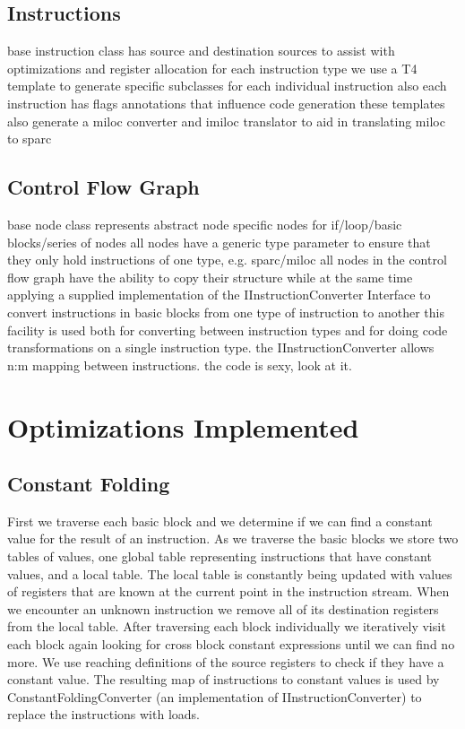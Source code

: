 \documentclass[12pt]{article}
\begin{document}
\subsection{Instructions}
base instruction class has source and destination sources to assist with optimizations and register allocation
for each instruction type we use a T4 template to generate specific subclasses for each individual instruction
also each instruction has flags annotations that influence code generation
these templates also generate a miloc converter and imiloc translator to aid in translating miloc to sparc

\subsection{Control Flow Graph}
base node class represents abstract node
specific nodes for if/loop/basic blocks/series of nodes
all nodes have a generic type parameter to ensure that they only hold instructions of one type, e.g. sparc/miloc
all nodes in the control flow graph have the ability to copy their structure while at the same time applying a supplied implementation of the IInstructionConverter Interface to convert instructions in basic blocks from one type of instruction to another
this facility is used both for converting between instruction types and for doing code transformations on a single instruction type.
the IInstructionConverter allows n:m mapping between instructions. the code is sexy, look at it.

\section{Optimizations Implemented}

\subsection{Constant Folding}
First we traverse each basic block and we determine if we can find a constant value for the result of an instruction.
As we traverse the basic blocks we store two tables of values, one global table representing instructions that have constant values, and a local table.
The local table is constantly being updated with values of registers that are known at the current point in the instruction stream.
When we encounter an unknown instruction we remove all of its destination registers from the local table.
After traversing each block individually we iteratively visit each block again looking for cross block constant expressions until we can find no more.
We use reaching definitions of the source registers to check if they have a constant value.
The resulting map of instructions to constant values is used by ConstantFoldingConverter (an implementation of IInstructionConverter) to replace the instructions with loads.
\end{document}
